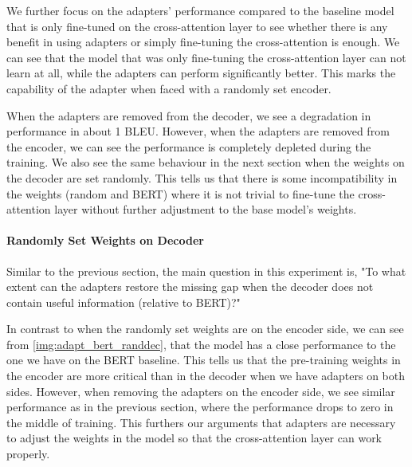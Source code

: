 We further focus on the adapters' performance compared to the baseline model that is only fine-tuned on the cross-attention layer to see whether there is any benefit in using adapters or simply fine-tuning the cross-attention is enough. We can see that the model that was only fine-tuning the cross-attention layer can not learn at all, while the adapters can perform significantly better. This marks the capability of the adapter when faced with a randomly set encoder.

When the adapters are removed from the decoder, we see a degradation in performance in about 1 BLEU. However, when the adapters are removed from the encoder, we can see the performance is completely depleted during the training. We also see the same behaviour in the next section when the weights on the decoder are set randomly. This tells us that there is some incompatibility in the weights (random and BERT) where it is not trivial to fine-tune the cross-attention layer without further adjustment to the base model's weights.

\paragraph{Randomly Set Weights on Decoder}
Similar to the previous section, the main question in this experiment is, "To what extent can the adapters restore the missing gap when the decoder does not contain useful information (relative to BERT)?"

In contrast to when the randomly set weights are on the encoder side, we can see from \cref{img:adapt_bert_randdec}, that the model has a close performance to the one we have on the BERT baseline. This tells us that the pre-training weights in the encoder are more critical than in the decoder when we have adapters on both sides. However, when removing the adapters on the encoder side, we see similar performance as in the previous section, where the performance drops to zero in the middle of training. This furthers our arguments that adapters are necessary to adjust the weights in the model so that the cross-attention layer can work properly.

